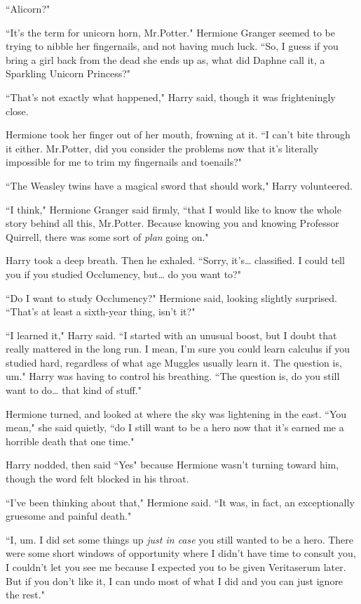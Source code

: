 ``Alicorn?"

``It's the term for unicorn horn, Mr.\?Potter." Hermione Granger seemed to be trying to nibble her fingernails, and not having much luck. ``So, I guess if you bring a girl back from the dead she ends up as, what did Daphne call it, a Sparkling Unicorn Princess?"

``That's not exactly what happened," Harry said, though it was frighteningly close.

Hermione took her finger out of her mouth, frowning at it. ``I can't bite through it either. Mr.\?Potter, did you consider the problems now that it's literally impossible for me to trim my fingernails and toenails?"

``The Weasley twins have a magical sword that should work," Harry volunteered.

``I think," Hermione Granger said firmly, ``that I would like to know the whole story behind all this, Mr.\?Potter. Because knowing you and knowing Professor Quirrell, there was some sort of \emph{plan} going on."

Harry took a deep breath. Then he exhaled. ``Sorry, it's{\ldots} classified. I could tell you if you studied Occlumency, but{\ldots} do you want to?"

``Do I want to study Occlumency?" Hermione said, looking slightly surprised. ``That's at least a sixth-year thing, isn't it?"

``I learned it," Harry said. ``I started with an unusual boost, but I doubt that really mattered in the long run. I mean, I'm sure you could learn calculus if you studied hard, regardless of what age Muggles usually learn it. The question is, um." Harry was having to control his breathing. ``The question is, do you still want to do{\ldots} that kind of stuff."

Hermione turned, and looked at where the sky was lightening in the east. ``You mean," she said quietly, ``do I still want to be a hero now that it's earned me a horrible death that one time."

Harry nodded, then said ``Yes" because Hermione wasn't turning toward him, though the word felt blocked in his throat.

``I've been thinking about that," Hermione said. ``It was, in fact, an exceptionally gruesome and painful death."

``I, um. I did set some things up \emph{just in case} you still wanted to be a hero. There were some short windows of opportunity where I didn't have time to consult you, I couldn't let you see me because I expected you to be given Veritaserum later. But if you don't like it, I can undo most of what I did and you can just ignore the rest."

